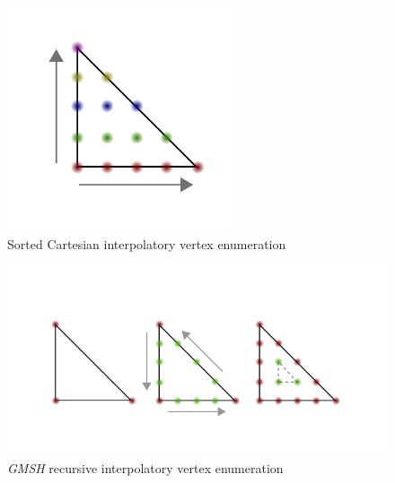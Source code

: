 \begin{figure}[H]
    \centering
    \includegraphics[scale=1]{images/vertex-grid-dune}
    \caption{Sorted Cartesian interpolatory vertex enumeration}
    \label{fig:appendix:gmsh:enumeration:dune}
\end{figure}

\begin{figure}[H]
    \centering
    \includegraphics[scale=1]{images/vertex-grid-gmsh}
    \caption{ \textit{GMSH} recursive interpolatory vertex enumeration}
    \label{fig:appendix:gmsh:enumeration:gmsh}
\end{figure}


